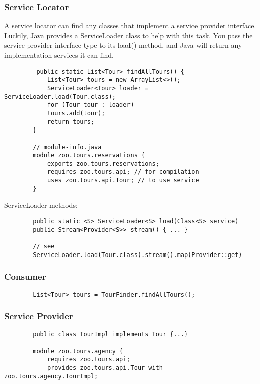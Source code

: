 \documentclass{scrartcl}
\begin{document}
\subsubsection{Service Locator}

    A service locator can find any classes that implement a service provider interface.
    Luckily, Java provides a ServiceLoader class to help with this task. You pass the service provider interface type to its load() method, and Java will return any implementation services it can find.

    \begin{lstlisting}
         public static List<Tour> findAllTours() {
            List<Tour> tours = new ArrayList<>();
            ServiceLoader<Tour> loader = ServiceLoader.load(Tour.class);
            for (Tour tour : loader)
            tours.add(tour);
            return tours;
        }

        // module-info.java
        module zoo.tours.reservations {
            exports zoo.tours.reservations;
            requires zoo.tours.api; // for compilation
            uses zoo.tours.api.Tour; // to use service
        }
    \end{lstlisting}

    ServiceLoader methods:

    \begin{lstlisting}
        public static <S> ServiceLoader<S> load(Class<S> service)
        public Stream<Provider<S>> stream() { ... }

        // see
        ServiceLoader.load(Tour.class).stream().map(Provider::get)
    \end{lstlisting}

\subsubsection{Consumer}

    \begin{lstlisting}
        List<Tour> tours = TourFinder.findAllTours();
    \end{lstlisting}


\subsubsection{Service Provider}

    \begin{lstlisting}
        public class TourImpl implements Tour {...}

        module zoo.tours.agency {
            requires zoo.tours.api;
            provides zoo.tours.api.Tour with zoo.tours.agency.TourImpl;
    \end{lstlisting}
\end{document}
